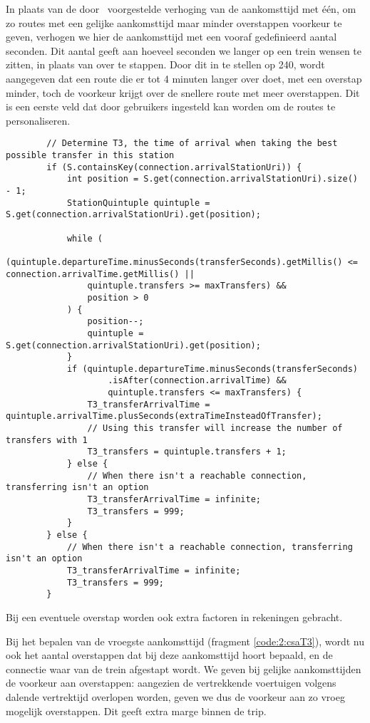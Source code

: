 In plaats van de door~\cite{strasser17} voorgestelde verhoging van de aankomsttijd met één, om zo routes met een gelijke aankomsttijd maar minder overstappen voorkeur te geven, verhogen we hier de aankomsttijd met een vooraf gedefinieerd aantal seconden. Dit aantal geeft aan hoeveel seconden we langer op een trein wensen te zitten, in plaats van over te stappen. Door dit in te stellen op 240, wordt aangegeven dat een route die er tot 4 minuten langer over doet, met een overstap minder, toch de voorkeur krijgt over de snellere route met meer overstappen. Dit is een eerste veld dat door gebruikers ingesteld kan worden om de routes te personaliseren.

\begin{code}
	\begin{verbatim}
		// Determine T3, the time of arrival when taking the best possible transfer in this station
		if (S.containsKey(connection.arrivalStationUri)) {
			int position = S.get(connection.arrivalStationUri).size() - 1;
			StationQuintuple quintuple = S.get(connection.arrivalStationUri).get(position);
		
			while (
				(quintuple.departureTime.minusSeconds(transferSeconds).getMillis() <= connection.arrivalTime.getMillis() ||
				quintuple.transfers >= maxTransfers) &&  
				position > 0
			) {
				position--;
				quintuple = S.get(connection.arrivalStationUri).get(position);
			}
			if (quintuple.departureTime.minusSeconds(transferSeconds)
					.isAfter(connection.arrivalTime) && 
					quintuple.transfers <= maxTransfers) {
				T3_transferArrivalTime = quintuple.arrivalTime.plusSeconds(extraTimeInsteadOfTransfer);
				// Using this transfer will increase the number of transfers with 1
				T3_transfers = quintuple.transfers + 1;
			} else {
				// When there isn't a reachable connection, transferring isn't an option
				T3_transferArrivalTime = infinite;
				T3_transfers = 999;
			}
		} else {
			// When there isn't a reachable connection, transferring isn't an option
			T3_transferArrivalTime = infinite;
			T3_transfers = 999;
		}
		\end{verbatim}
						\caption[CSA: Bepalen van aankomsttijden]{Bij een eventuele overstap worden ook extra factoren in rekeningen gebracht.}
		\label{code:2:csaT3}
\end{code}
Bij het bepalen van de vroegste aankomsttijd (fragment \ref{code:2:csaT3}), wordt nu ook het aantal overstappen dat bij deze aankomsttijd hoort bepaald, en de connectie waar van de trein afgestapt wordt. We geven bij gelijke aankomsttijden de voorkeur aan overstappen: aangezien de vertrekkende voertuigen volgens dalende vertrektijd overlopen worden, geven we dus de voorkeur aan zo vroeg mogelijk overstappen. Dit geeft extra marge binnen de trip.
